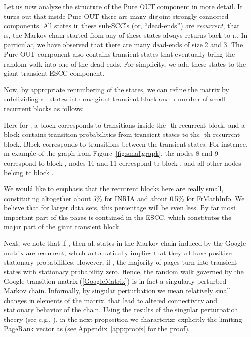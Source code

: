 \documentclass{article}
\begin{document}
Let us now analyze the structure of the Pure OUT component in more
detail. It turns out that inside  Pure OUT there are many disjoint
strongly connected components. All states in these sub-SCC's (or,
``dead-ends'') are {\it recurrent}, that is, the Markov chain
started from any of these states always returns back to it. In
particular, we have observed that there are many dead-ends of size 2
and 3.
The Pure OUT component also contains transient states that
eventually bring the random walk into one of the dead-ends. For
simplicity, we add these states to the giant transient ESCC
component.

Now, by appropriate renumbering of the states, we can refine the
matrix  by subdividing all states into one giant transient block
and a number of small recurrent blocks as follows:
 
Here for , a block   corresponds to transitions
inside the -th recurrent block, and a block  contains
transition probabilities from transient states to the -th
recurrent block. Block  corresponds to transitions between the
transient states. For instance, in example of the graph from
Figure~\ref{fig:smallgraph}, the nodes 8 and 9 correspond to block
, nodes 10 and 11 correspond to block , and all other
nodes belong to block .

We would like to emphasis that the recurrent blocks here are really
small, constituting altogether about 5\% for INRIA and about 0.5\%
for FrMathInfo. We believe that for larger data sets, this
percentage will be even less. By far most important part of the
pages is contained in the ESCC, which constitutes the major part of
the giant transient block.

Next, we note that if , then all states in the Markov chain
induced by the Google matrix  are recurrent, which automatically
implies that they all have positive stationary probabilities.
However, if , the majority of pages turn into transient states
with stationary probability zero. Hence, the random walk governed by
the Google transition matrix (\ref{GoogleMatrix}) is in fact a
singularly perturbed Markov chain. Informally, by singular
perturbation we mean relatively small changes in elements of the
matrix, that lead to altered connectivity and stationary behavior of
the chain. Using the results of the singular perturbation theory
(see e.g.,
\cite{Avrachenkov99thesis,KorolyukTurbin,PervozvanskiiGaitsgori,YinZhang}),
in the next proposition we characterize explicitly the limiting
PageRank vector as  (see Appendix~\ref{app:proofs} for the
proof).
\end{document}
